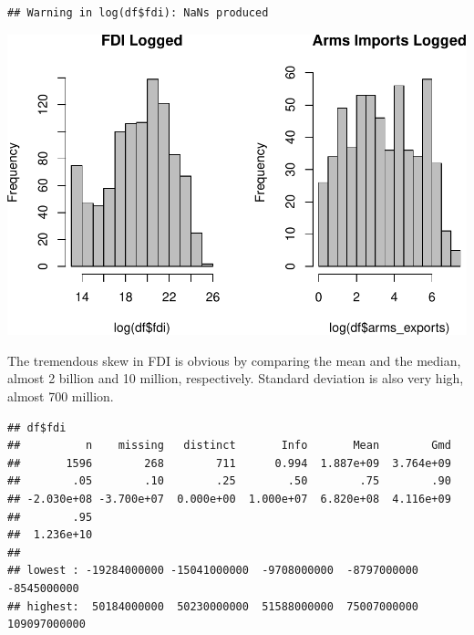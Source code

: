 \documentclass[12pt,]{article}
\newenvironment{Shaded}{\begin{snugshade}}{\end{snugshade}}
\newcommand{\DataTypeTok}[1]{\textcolor[rgb]{0.13,0.29,0.53}{#1}}
\newcommand{\KeywordTok}[1]{\textcolor[rgb]{0.13,0.29,0.53}{\textbf{#1}}}
\newcommand{\NormalTok}[1]{#1}
\newcommand{\OperatorTok}[1]{\textcolor[rgb]{0.81,0.36,0.00}{\textbf{#1}}}
\newcommand{\StringTok}[1]{\textcolor[rgb]{0.31,0.60,0.02}{#1}}
\begin{document}
\begin{verbatim}
## Warning in log(df$fdi): NaNs produced
\end{verbatim}

\begin{Shaded}
\end{Shaded}

\includegraphics{proposal_files/figure-latex/unnamed-chunk-14-1.pdf}

The tremendous skew in FDI is obvious by comparing the mean and the
median, almost 2 billion and 10 million, respectively. Standard
deviation is also very high, almost 700 million.

\begin{Shaded}
\end{Shaded}

\begin{verbatim}
## df$fdi 
##          n    missing   distinct       Info       Mean        Gmd 
##       1596        268        711      0.994  1.887e+09  3.764e+09 
##        .05        .10        .25        .50        .75        .90 
## -2.030e+08 -3.700e+07  0.000e+00  1.000e+07  6.820e+08  4.116e+09 
##        .95 
##  1.236e+10 
## 
## lowest : -19284000000 -15041000000  -9708000000  -8797000000  -8545000000
## highest:  50184000000  50230000000  51588000000  75007000000 109097000000
\end{verbatim}
\end{document}
